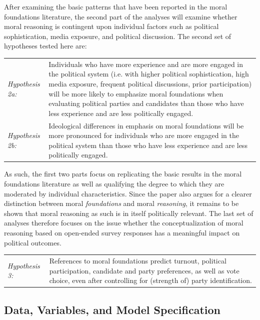 \documentclass[12pt]{article}
\begin{document}
After examining the basic patterns that have been reported in the moral foundations literature, the second part of the analyses will examine whether moral reasoning is contingent upon individual factors such as political sophistication, media exposure, and political discussion. The second set of hypotheses tested here are:

\vspace{0.3cm}
\begin{tabular}{lp{12cm}}
\textsl{Hypothesis 2a:} & Individuals who have more experience and are more engaged in the political system (i.e. with higher political sophistication, high media exposure, frequent political discussions, prior participation) will be more likely to emphasize moral foundations when evaluating political parties and candidates than those who have less experience and are less politically engaged. \\
\textsl{Hypothesis 2b:} & Ideological differences in emphasis on moral foundations will be more pronounced for individuals who are more engaged in the political system than those who have less experience and are less politically engaged.
\end{tabular}
\vspace{0.5cm}

As such, the first two parts focus on replicating the basic results in the moral foundations literature as well as qualifying the degree to which they are moderated by individual characteristics. Since the paper also argues for a clearer distinction between moral \textit{foundations} and moral \textit{reasoning}, it remains to be shown that moral reasoning as such is in itself politically relevant. The last set of analyses therefore focuses on the issue whether the conceptualization of moral reasoning based on open-ended survey responses has a meaningful impact on political outcomes.

\vspace{0.3cm}
\begin{tabular}{lp{12cm}}
\textsl{Hypothesis 3:} & References to moral foundations predict turnout, political participation, candidate and party preferences, as well as vote choice, even after controlling for (strength of) party identification.
\end{tabular}
\vspace{0.5cm}


\subsection{Data, Variables, and Model Specification}
\end{document}
